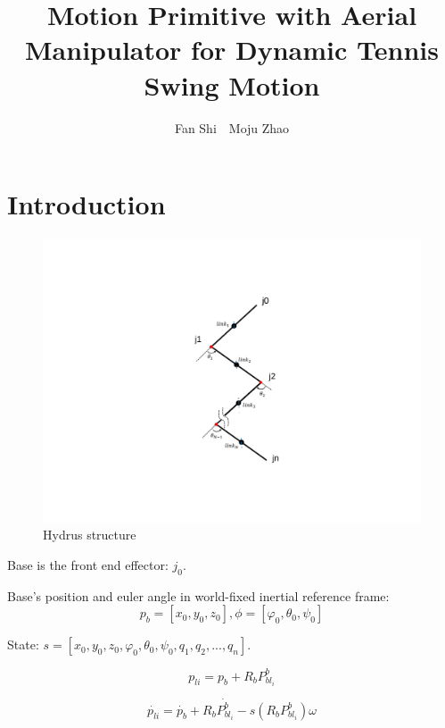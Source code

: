 \documentclass{jarticle}
\begin{document}
\title{Motion Primitive with Aerial Manipulator for Dynamic Tennis Swing Motion}
\author{Fan Shi\ \ Moju Zhao}

\setlength{\baselineskip}{4.4mm}
\maketitle
\thispagestyle{empty}
\pagestyle{empty}

\section{Introduction}
\begin{figure}[htb]
  \centering
  \includegraphics[clip, bb= 250 100 525 500,  width=\columnwidth]{figs_orig/hydrus-mechanical.pdf}
  \caption{Hydrus structure}
  \label{fig:abst-image}
\end{figure}

Base is the front end effector: $j_0$.

Base's position and euler angle in world-fixed inertial reference frame:
\begin{equation}
  p_b = [x_0, y_0, z_0], \phi = [\varphi_0, \theta_0, \psi_0]
\end{equation}

State: $s = [x_0, y_0, z_0, \varphi_0, \theta_0, \psi_0, q_1, q_2, ..., q_n]$.

\begin{equation}
  p_{li} = p_b + R_b P_{bl_i}^b
\end{equation}

\begin{equation}
  \dot{p_{li}} = \dot{p_b} + R_b \dot{P_{bl_i}^b} - s(R_b P_{bl_i}^b) \omega
\end{equation}
\end{document}
